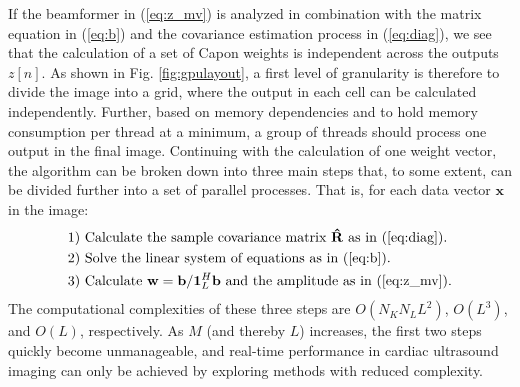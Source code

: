 \documentclass[journal]{IEEEtran}
\newcommand{\mat}[1]{\mathbf{#1}}
\renewcommand{\vec}[1]{\mathbf{#1}}
\begin{document}
If the beamformer in (\ref{eq:z_mv}) is analyzed in combination with the matrix equation in (\ref{eq:b}) and the covariance estimation process in (\ref{eq:diag}), we see that the calculation of a set of Capon weights is independent across the outputs $z[n]$. As shown in Fig. \ref{fig:gpulayout}, a first level of granularity is therefore to divide the image into a grid, where the output in each cell can be calculated independently. Further, based on memory dependencies and to hold memory consumption per thread at a minimum, a group of threads should process one output in the final image. Continuing with the calculation of one weight vector, the algorithm can be broken down into three main steps that, to some extent, can be divided further into a set of parallel processes. That is, for each data vector $\vec{x}$ in the image:
\begin{align*}
\text{1) } &\text{Calculate the sample covariance matrix } \mat{\hat{R}} \text{ as in } \text{(\ref{eq:diag})}.\\
\text{2) } &\text{Solve the linear system of equations as in (\ref{eq:b}}).\\ %
\text{3) } &\text{Calculate } \vec{w} = \vec{b}/\vec{1}_{L}^H\vec{b} \text{ and the amplitude as in (\ref{eq:z_mv})}.
\end{align*}
The computational complexities of these three steps are $O(N_KN_LL^2)$, $O(L^3)$, and $O(L)$, respectively. As $M$ (and thereby $L$) increases, the first two steps quickly become unmanageable, and real-time performance in cardiac ultrasound imaging can only be achieved by exploring methods with reduced complexity.
\end{document}
